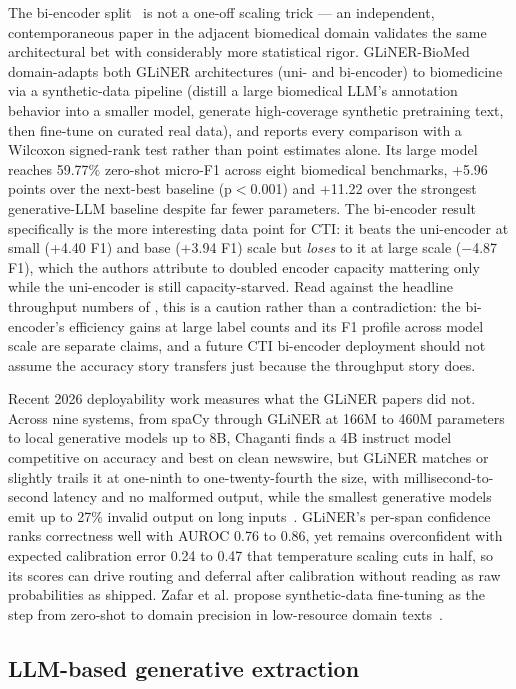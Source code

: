 \documentclass[11pt]{article}
\begin{document}
The bi-encoder split~\citep{stepanov2026millionlabel} is not a one-off scaling trick — an independent, contemporaneous paper in the adjacent biomedical domain validates the same architectural bet with considerably more statistical rigor. GLiNER-BioMed domain-adapts both GLiNER architectures (uni- and bi-encoder) to biomedicine via a synthetic-data pipeline (distill a large biomedical LLM's annotation behavior into a smaller model, generate high-coverage synthetic pretraining text, then fine-tune on curated real data), and reports every comparison with a Wilcoxon signed-rank test rather than point estimates alone. Its large model reaches 59.77\% zero-shot micro-F1 across eight biomedical benchmarks, +5.96 points over the next-best baseline (p$<$0.001) and +11.22 over the strongest generative-LLM baseline despite far fewer parameters. The bi-encoder result specifically is the more interesting data point for CTI: it beats the uni-encoder at small (+4.40 F1) and base (+3.94 F1) scale but \emph{loses} to it at large scale ($-$4.87 F1), which the authors attribute to doubled encoder capacity mattering only while the uni-encoder is still capacity-starved. Read against the headline throughput numbers of \citet{stepanov2026millionlabel}, this is a caution rather than a contradiction: the bi-encoder's efficiency gains at large label counts and its F1 profile across model scale are separate claims, and a future CTI bi-encoder deployment should not assume the accuracy story transfers just because the throughput story does.

Recent 2026 deployability work measures what the GLiNER papers did not. Across nine systems, from spaCy through GLiNER at 166M to 460M parameters to local generative models up to 8B, Chaganti finds a 4B instruct model competitive on accuracy and best on clean newswire, but GLiNER matches or slightly trails it at one-ninth to one-twenty-fourth the size, with millisecond-to-second latency and no malformed output, while the smallest generative models emit up to 27\% invalid output on long inputs~\citep{chaganti2026ondevice}. GLiNER's per-span confidence ranks correctness well with AUROC 0.76 to 0.86, yet remains overconfident with expected calibration error 0.24 to 0.47 that temperature scaling cuts in half, so its scores can drive routing and deferral after calibration without reading as raw probabilities as shipped. Zafar et al. propose synthetic-data fine-tuning as the step from zero-shot to domain precision in low-resource domain texts~\citep{zafar2026zeroshot}.

\subsection{LLM-based generative extraction}
\end{document}
